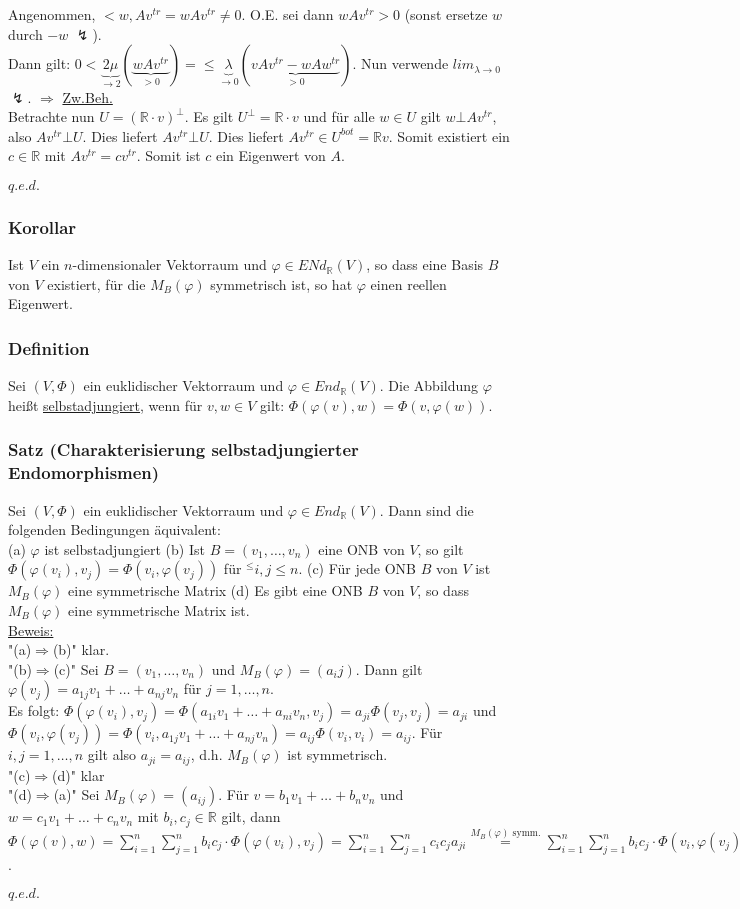 \documentclass[a4paper]{article}
\newcommand{\ul}{\underline}
\renewcommand{\proof}{\ul{Beweis:}\\}
\renewcommand{\qed}{\begin{flushright}
\ul{\(q.e.d.\)}
\end{flushright}}
\let\phi\varphi
\begin{document}
Angenommen, \(<w,Av^{tr}=wAv^{tr}\neq 0\). O.E. sei dann \(wAv^{tr}>0\) (sonst ersetze \(w\) durch \(-w\) \(\lightning\)).\\
Dann gilt: \(0<\underbrace{2\mu}_{\rightarrow 2}(\underbrace{wAv^{tr}}_{>0})=\leq \underbrace{\lambda}_{\rightarrow 0} (\underbrace{vAv^{tr}-wAw^{tr}}_{>0})\). Nun verwende \(lim_{\lambda\rightarrow 0}\) \(\lightning\).
\(\Rightarrow \) \ul{Zw.Beh.}\\
Betrachte nun \(U=(\mathbb{R}\cdot v)^\bot\). Es gilt \(U^\bot=\mathbb{R}\cdot v\) und für alle \(w\in U\) gilt \(w\bot Av^{tr}\), also \(Av^{tr}\bot U\). Dies liefert \(Av^{tr}\bot U\). Dies liefert \(Av^{tr}\in U^{bot}=\mathbb{R}v\). Somit existiert ein \(c\in\mathbb{R}\) mit \(Av^{tr}=cv^{tr}\). Somit ist \(c\) ein Eigenwert von \(A\).
\qed
\subsubsection{Korollar}
Ist \(V\) ein \(n\)-dimensionaler Vektorraum und \(\phi\in ENd_\mathbb{R}(V)\), so dass eine Basis \(B\) von \(V\) existiert, für die \(M_B(\phi)\) symmetrisch ist, so hat \(\phi\) einen reellen Eigenwert.
\subsubsection{Definition}
Sei \((V,\Phi)\) ein euklidischer Vektorraum und \(\phi\in End_\mathbb{R}(V)\). Die Abbildung \(\phi\) heißt \ul{selbstadjungiert}, wenn für \(v,w\in V\) gilt: \(\Phi(\phi(v),w)=\Phi(v,\phi(w))\).
\subsubsection{Satz (Charakterisierung selbstadjungierter Endomorphismen)}
Sei \((V,\Phi)\) ein euklidischer Vektorraum und \(\phi\in End_\mathbb{R}(V)\). Dann sind die folgenden Bedingungen äquivalent:\\
(a) \(\phi\) ist selbstadjungiert
(b) Ist \(B=(v_1,\dots,v_n)\) eine ONB von \(V\), so gilt \(\Phi(\phi(v_i), v_j)=\Phi(v_i,\phi(v_j))\) für \(^\leq i,j\leq n\).
(c) Für jede ONB \(B\) von \(V\) ist \(M_B(\phi)\) eine symmetrische Matrix
(d) Es gibt eine ONB \(B\) von \(V\), so dass \(M_B(\phi)\) eine symmetrische Matrix ist.\\
\proof
"(a)\(\Rightarrow\)(b)" klar.\\
"(b)\(\Rightarrow\)(c)" Sei \(B=(v_1,\dots,v_n)\) und \(M_B(\phi)=(a_ij)\). Dann gilt \(\phi(v_j)=a_{1j}v_1+\dots+a_{nj}v_n\) für \(j=1,\dots,n\).\\
Es folgt: \(\Phi(\phi(v_i), v_j)=\Phi(a_{1i}v_1+\dots+a_{ni}v_n,v_j)=a_{ji}\Phi(v_j,v_j)=a_{ji}\) und \(\Phi(v_i,\phi(v_j))=\Phi(v_i,a_{1j}v_1+\dots+a_{nj}v_n)=a_{ij}\Phi(v_i,v_i)=a_{ij}\). Für \(i,j=1,\dots,n\) gilt also \(a_{ji}=a_{ij}\), d.h. \(M_B(\phi)\) ist symmetrisch.\\
"(c)\(\Rightarrow\)(d)" klar\\
"(d)\(\Rightarrow\)(a)" Sei \(M_B(\phi)=(a_{ij})\). Für \(v=b_1v_1+\dots+b_nv_n\) und \(w=c_1v_1+\dots+c_nv_n\) mit \(b_i,c_j\in\mathbb{R}\) gilt, dann \(\Phi(\phi(v),w)=\sum_{i=1}^n\sum_{j=1}^nb_ic_j\cdot \Phi(\phi(v_i),v_j)=\sum_{i=1}^n\sum_{j=1}^nc_ic_ja_{ji}\overset{M_B(\phi)\text{ symm.}}{=}\sum_{i=1}^n\sum_{j=1}^nb_ic_j\cdot \Phi(v_i,\phi(v_j))=\Phi(v,\phi(w))\).
\qed
\end{document}
